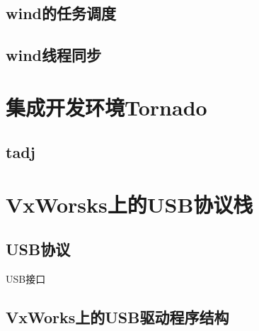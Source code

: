 \subsection{wind的任务调度}

\subsection{wind线程同步}

\section{集成开发环境Tornado}
\subsection{tadj}

\section{VxWorsks上的USB协议栈}
\subsection{USB协议}
USB接口
\subsection{VxWorks上的USB驱动程序结构}

